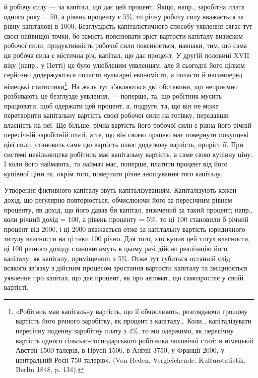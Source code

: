 \parcont{}  %
й робочу силу — за капітал, що дає цей процент. Якщо, напр., заробітна плата
одного року = 50, а рівень проценту є 5\%, то річну робочу силу вважається
за рівну капіталові в 1000. Безглуздість капіталістичного способу
уявлення сягає тут своєї найвищої точки, бо замість пояснювати зріст вартости
капіталу визиском робочої сили, продуктивність робочої сили пояснюється, навпаки,
тим, що сама ця робоча сила є містична річ, капітал, що дає процент.
У другій половині XVII віку (напр., у Петті) це було улюбленим уявленням,
але й сьогодні його цілком серйозно додержуються почасти вульґарні економісти,
а почасти й насамперед німецькі статистики\footnote{
«Робітник мав капітальну вартість, що ії обчислюють, розглядаючи грошову вартість його
річного заробітку, як процент з капіталу\dots{} Коли\dots{} капіталізувати пересічну поденну заробітну
плату з 4\%, то ми одержимо, як пересічну вартість одного сільсько-господарського робітника чоловічої
статі: в німецькій Австрії 1500 талерів, в Прусії 1500, в Англії 3750, у Франції 2000, у
центральній Росії 750 талерів». (Von Reden, Vergleichende. Kulturstatistik, Berlin 1848, p. 134).
}. На жаль тут з’являються дві
обставини, що неприємно розбивають це безглузде уявлення, — поперше, та, що
робітник мусить працювати, щоб одержати цей процент, а, подруге, та, що він
не може перетворити капітальну вартість своєї робочої сили на готівку, передавши
власність на неї. Ще більше, річна вартість його робочої сили є рівна
його річній пересічній заробітній платі, а те, що він своєю працею має повернути
покупцеві цієї сили, становить саме цю вартість плюс додаткову вартість,
приріст її. При системі невільництва робітник має капітальну вартість, а саме
свою купівну ціну. І коли його наймають, то наймач має, поперше, платити
процент від його купівної ціни та, окрім того, повертати річне зношування
того капіталу.

Утворення фіктивного капіталу звуть капіталізуванням. Капіталізують кожен
дохід, що реґулярно повторюється, обчислюючи його за пересічним рівнем проценту,
яв дохід, що його давав би капітал, визичений за такий процент; напр.,
коли річний дохід = 100, а рівень проценту = 5\%, то ці 100
становили б річний процент від 2000, і ці 2000 вважається отже
за капітальну вартість юридичного титулу власности на ці таки 100
річно. Для того, хто купив цей титул власности, ці 100 річного доходу
становитимуть в цьому разі дійсно реалізацію його капіталу, як капіталу, приміщеного
з 5\%. Отже тут губиться останній слід всякого зв’язку з дійсним
процесом зростання вартости капіталу та зміцнюється уявлення про капітал, що
дає процент, як про автомат, що самозростає у своїй вартісті.


